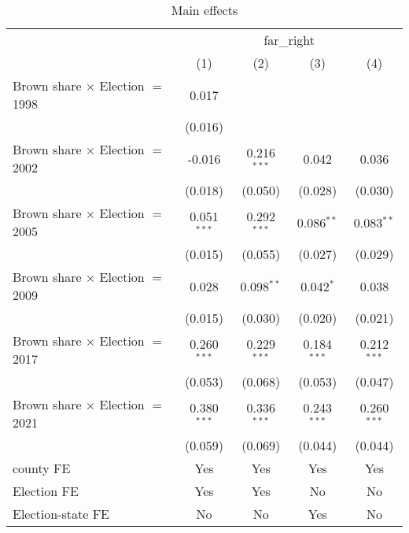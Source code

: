 \begin{table}[htbp]
   \caption{Main effects}
   \centering
   \begin{tabular}{lcccc}
      \tabularnewline \midrule \midrule
       & \multicolumn{4}{c}{far\_right}\\
                                              & (1)           & (2)           & (3)           & (4)\\  
      Brown share $\times$ Election $=$ 1998  & 0.017         &               &               &   \\   
                                              & (0.016)       &               &               &   \\   
      Brown share $\times$ Election $=$ 2002  & -0.016        & 0.216$^{***}$ & 0.042         & 0.036\\   
                                              & (0.018)       & (0.050)       & (0.028)       & (0.030)\\   
      Brown share $\times$ Election $=$ 2005  & 0.051$^{***}$ & 0.292$^{***}$ & 0.086$^{**}$  & 0.083$^{**}$\\   
                                              & (0.015)       & (0.055)       & (0.027)       & (0.029)\\   
      Brown share $\times$ Election $=$ 2009  & 0.028         & 0.098$^{**}$  & 0.042$^{*}$   & 0.038\\   
                                              & (0.015)       & (0.030)       & (0.020)       & (0.021)\\   
      Brown share $\times$ Election $=$ 2017  & 0.260$^{***}$ & 0.229$^{***}$ & 0.184$^{***}$ & 0.212$^{***}$\\   
                                              & (0.053)       & (0.068)       & (0.053)       & (0.047)\\   
      Brown share $\times$ Election $=$ 2021  & 0.380$^{***}$ & 0.336$^{***}$ & 0.243$^{***}$ & 0.260$^{***}$\\   
                                              & (0.059)       & (0.069)       & (0.044)       & (0.044)\\   
      county FE                               & Yes           & Yes           & Yes           & Yes\\  
      Election FE                             & Yes           & Yes           & No            & No\\  
      Election-state FE                       & No            & No            & Yes           & No\\  

\end{tabular}
\end{table}
